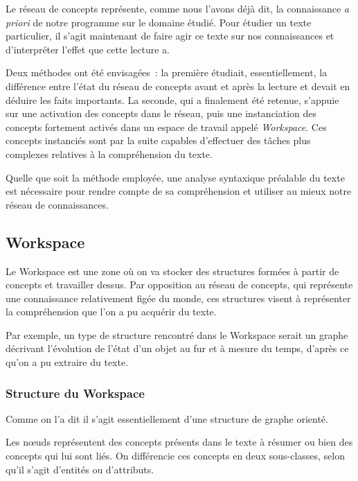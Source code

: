 \documentclass[a4paper, 12pt]{article}
\begin{document}
Le réseau de concepts représente, comme nous l'avons déjà dit, la connaissance \textit{a priori} de notre programme sur le domaine étudié. Pour étudier un texte particulier, il s'agit maintenant de faire agir ce texte sur nos connaissances et d'interpréter l'effet que cette lecture a.

Deux méthodes ont été envisagées~: la première étudiait, essentiellement, la différence entre l'état du réseau de concepts avant et après la lecture et devait en déduire les faits importants. La seconde, qui a finalement été retenue, s'appuie sur une activation des concepts dans le réseau, puis une instanciation des concepts fortement activés dans un espace de travail appelé \textit{Workspace}. Ces concepts instanciés sont par la suite capables d'effectuer des tâches plus complexes relatives à la compréhension du texte.

Quelle que soit la méthode employée, une analyse syntaxique préalable du texte est nécessaire pour rendre compte de sa compréhension et utiliser au mieux notre réseau de connaissances.

\subsection{Workspace}

\begin{definition}[Workspace]
Le Workspace est une zone où on va stocker des structures formées à partir de concepts et travailler dessus. Par opposition au réseau de concepts, qui représente une connaissance relativement figée du monde, ces structures visent à représenter la compréhension que l'on a pu acquérir du texte.
\end{definition}

Par exemple, un type de structure rencontré dans le Workspace serait un graphe décrivant l'évolution de l'état d'un objet au fur et à mesure du temps, d'après ce qu'on a pu extraire du texte.

\subsubsection{Structure du Workspace}
Comme on l'a dit il s'agit essentiellement d'une structure de graphe orienté.

Les nœuds représentent des concepts présents dans le texte à résumer ou bien des concepts qui lui sont liés. On différencie ces concepts en deux sous-classes, selon qu'il s'agit d'entités ou d'attributs.
\end{document}
